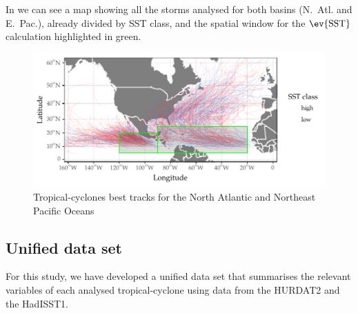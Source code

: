 In  we can see a map showing all the storms analysed for both basins (N.~Atl. and E.~Pac.), already divided by SST class, and the spatial window for the $\ev{\text{SST}}$ calculation highlighted in green.
\begin{figure}[H]
	\centering
	\includegraphics[width=\textwidth]{images/full-map}
	\caption{Tropical-cyclones best tracks for the North Atlantic and Northeast Pacific Oceans}
	\label{fig:full-map}
\end{figure}

\subsection{Unified data set}\label{ssec:unified-data-set}
For this study, we have developed a unified data set that summarises the relevant variables of each analysed tropical-cyclone using data from the HURDAT2 and the HadISST1.

